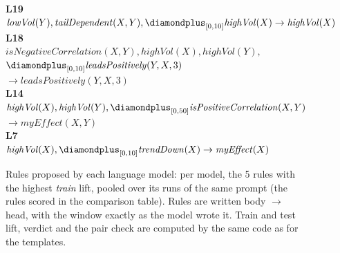 \begin{figure}[t]
{\begin{minipage}{0.95\textwidth}
\textbf{L19}\\
\hspace*{1.5em}\mbox{$\mathit{lowVol}(Y), \mathit{tailDependent}(X,Y), \diamondplus_{[0,10]} \mathit{highVol}(X) \to \mathit{highVol}(X)$}\\[4pt]
\textbf{L18}\\
\hspace*{1.5em}\mbox{$\mathit{isNegativeCorrelation}(X,Y), \mathit{highVol}(X), \mathit{highVol}(Y),$}\\
\hspace*{1.5em}\hspace*{1.5em}\mbox{$\diamondplus_{[0,10]} \mathit{leadsPositively}(Y,X,3)$}\\
\hspace*{1.5em}\hspace*{3em}\mbox{$\to \mathit{leadsPositively}(Y,X,3)$}\\[4pt]
\textbf{L14}\\
\hspace*{1.5em}\mbox{$\mathit{highVol}(X), \mathit{highVol}(Y), \diamondplus_{[0,50]} \mathit{isPositiveCorrelation}(X,Y)$}\\
\hspace*{1.5em}\hspace*{3em}\mbox{$\to \mathit{myEffect}(X,Y)$}\\[4pt]
\textbf{L7}\\
\hspace*{1.5em}\mbox{$\mathit{highVol}(X), \diamondplus_{[0,10]} \mathit{trendDown}(X) \to \mathit{myEffect}(X)$}
\end{minipage}}
\caption{Rules proposed by each language model: per model, the 5 rules with the highest \emph{train} lift, pooled over its runs of the same prompt (the rules scored in the comparison table). Rules are written body $\to$ head, with the window exactly as the model wrote it. Train and test lift, verdict and the pair check are computed by the same code as for the templates.}
\label{fig:llm-rules-pub}
\end{figure}
